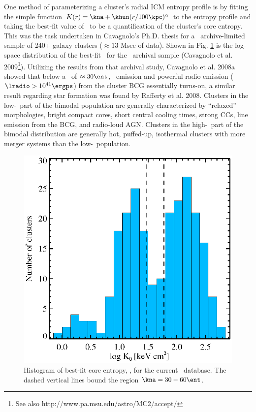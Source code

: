 \documentclass[letterpaper,11pt,twocolumn]{article}
\begin{document}
One method of parameterizing a cluster's radial ICM entropy profile is
by fitting the simple function $K(r) = \kna + \khun
(r/100\kpc)^{\alpha}$ to the entropy profile and taking the best-fit
value of \kna\ to be a quantification of the cluster's core
entropy. This was the task undertaken in Cavagnolo's Ph.D. thesis for
a \chandra\ archive-limited sample of 240+ galaxy clusters ($\approx
13$ Msec of data). Shown in Fig. \ref{fig:hist} is the log-space
distribution of the best-fit \kna\ for the \chandra\ archival sample
(Cavagnolo et al. 2009\footnote{See also
  http://www.pa.msu.edu/astro/MC2/accept/}). Utilizing the results
from that archival study, Cavagnolo et al. 2008a showed that below a
\kna\ of $\approx 30 \ent$, \halpha\ emission and powerful radio
emission ($\lradio > 10^{41} \ergps$) from the cluster BCG essentially
turns-on, a similar result regarding star formation was found by
Rafferty et al. 2008.  Clusters in the low-\kna\ part of the bimodal
population are generally characterized by ``relaxed'' morphologies,
bright compact cores, short central cooling times, strong CCs, line
emission from the BCG, and radio-loud AGN. Clusters in the
high-\kna\ part of the bimodal distribution are generally hot,
puffed-up, isothermal clusters with more merger systems than the
low-\kna\ population.
\begin{figure}[htp]
\begin{center}
  \includegraphics*[width=0.8\columnwidth, trim=30mm 8mm 40mm 18mm, clip]{k0hist}
  \caption{Histogram of best-fit core entropy, \kna, for the current
    \accept\ database. The dashed vertical lines bound the region
    $\kna = 30-60 \ent$.}
  \label{fig:hist}
\end{center}
\end{figure}
\end{document}
